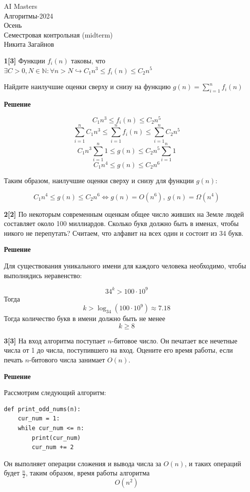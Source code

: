 \documentclass{article}
\begin{document}
\begin{center}
    \Large {AI Masters \\
        Алгоритмы-2024 \\
        Осень \\
        Семестровая контрольная (midterm) \\
        Никита Загайнов}
\end{center}

\bigskip

\textbf{1[3]} Функции $f_i(n)$ таковы, что $\exists C > 0, N \in \mathbb{N} : \forall n > N \hookrightarrow C_1 n^3 \leq f_i(n) \leq C_2 n^5$

Найдите наилучшие оценки сверху и снизу на функцию $g(n) = \sum\limits_{i=1}^n f_i(n)$

\medskip
\textbf{Решение}

\[
    C_1 n^3 \leq f_i(n) \leq C_2 n^5
\]
\[
    \sum_{i=1}^n C_1 n^3 \leq \sum_{i=1}^n f_i(n) \leq \sum_{i=1}^n C_2 n^5
\]
\[
    C_1 n^3 \sum_{i=1}^n 1 \leq g(n) \leq C_2 n^5 \sum_{i=1}^n 1
\]
\[
    C_1 n^4 \leq g(n) \leq C_2 n^6
\]

Таким образом, наилучшие оценки сверху и снизу для функции $g(n)$:

\[
    C_1 n^4 \leq g(n) \leq C_2 n^6 \Longleftrightarrow g(n) = O(n^6), \ g(n) = \Omega(n^4)
\]

\medskip

\textbf{2[2]} По некоторым современным оценкам общее число живших на Земле людей составляет около 100 миллиардов. Сколько букв должно быть в именах, чтобы никого не перепутать? Считаем, что алфавит на всех один и состоит из 34 букв.

\medskip

\textbf{Решение}

Для существования уникального имени для каждого
человека необходимо, чтобы выполнядись неравенство:

\[
    34^k > 100 \cdot 10^9
\]
Тогда
\[
    k > \log_{34}(100 \cdot 10^9) \approx 7.18
\]
Тогда количество букв в имени должно быть не менее
\[
    k \geq 8
\]
\medskip

\textbf{3[3]} На вход алгоритма поступает $n$-битовое число. Он печатает все нечетные числа от 1 до числа, поступившего на вход. Оцените его время работы, если печать $n$-битового числа занимает $O(n)$.

\medskip

\textbf{Решение}

Рассмотрим следующий алгоритм:
\begin{lstlisting}
def print_odd_nums(n):
    cur_num = 1:
    while cur_num <= n:
        print(cur_num)
        cur_num += 2
\end{lstlisting}
Он выполняет операции сложения и вывода числа
за $O(n)$, и таких операций будет $\frac{n}{2}$,
таким образом, время работы алгоритма
\[
    O(n^2)
\]
\medskip
\end{document}

